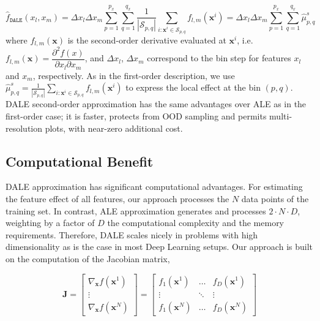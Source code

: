 \documentclass[wcp]{jmlr}
\newcommand{\dale}{\hat{f}_{\mathtt{DALE}}}
\newcommand{\xb}{\mathbf{x}}
\newcommand{\Jac}{\mathbf{J}}
\begin{document}
\begin{equation} \dale(x_l, x_m) = \Delta x_l \Delta x_m \sum_{p=1}^{p_x} \sum_{q=1}^{q_x} \frac{1}{|\mathcal{S}_{p,q}|} \sum_{i:\xb^i \in \mathcal{S}_{p,q}}f_{l,m}(\xb^i) = \Delta x_l \Delta x_m \sum_{p=1}^{p_x} \sum_{q=1}^{q_x} \hat{\mu}_{p,q}^s
  \label{eq:DALE-2}
\end{equation}
%
where \( f_{l,m}(\xb) \) is the second-order derivative evaluated at \(\xb^i\), i.e.  \( f_{l,m}(\xb) = \dfrac{\partial^2f(x)}{\partial x_l \partial x_m} \), and \(\Delta x_l\), \(\Delta x_m\) correspond to the bin step for features \(x_l\) and \(x_m\), respectively. As in the first-order description, we use \( \hat{\mu}_{p,q}^s = \frac{1}{|\mathcal{S}_{p,q}|} \sum_{i:\xb^i \in \mathcal{S}_{p,q}}f_{l,m}(\xb^i)\) to express the local effect at the bin \( (p, q) \). DALE second-order approximation has the same advantages over ALE as in the first-order case; it is faster, protects from OOD sampling and permits multi-resolution plots, with near-zero additional cost.

\subsection{Computational Benefit}
\label{sec:4-2-computational}

DALE approximation has significant computational advantages. For estimating the feature effect of all features, our approach processes the \(N\) data points of the training set. In contrast, ALE approximation generates and processes \(2 \cdot N \cdot D\), weighting by a factor of \(D\) the computational complexity and the memory requirements. Therefore, DALE scales nicely in problems with high dimensionality as is the case in most Deep Learning setups. Our approach is built on the computation of the Jacobian matrix,

\begin{equation} \Jac =
  \begin{bmatrix} \nabla_{\xb}f(\xb^1) \\ \vdots \\ \nabla_{\xb}f(\xb^N)
  \end{bmatrix} =
  \begin{bmatrix} f_1(\xb^1) & \dots & f_D(\xb^1)\\ \vdots & \ddots & \vdots \\ f_1(\xb^N) & \dots & f_D(\xb^N)
  \end{bmatrix}
\label{eq:jacobian}
\end{equation}
\end{document}
